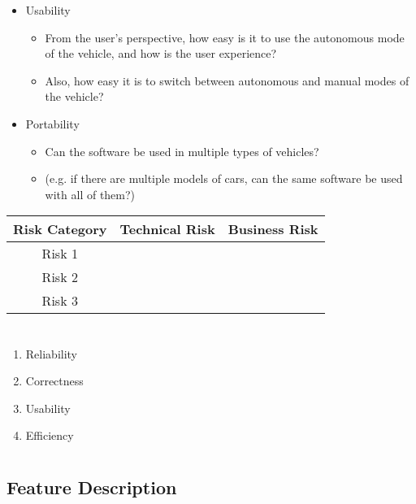 \documentclass[letterpaper]{article}
\begin{document}
\begin{itemize}
\begin{itemize}
	\end{itemize}
	\item Usability
	\begin{itemize}	
	\item From the user's perspective, how easy is it to use the autonomous mode of the vehicle, and how is the user experience?
		\item Also, how easy it is to switch between autonomous and manual modes of the vehicle?
	\end{itemize}
	\item Portability
	\begin{itemize}	
	\item Can the software be used in multiple types of vehicles? 
		\item (e.g. if there are multiple models of cars, can the same software be used with all of them?)
	\end{itemize}
\end{itemize}

\begin{table}[H]
\centering
\begin{tabular}{c|c|c|}
Risk Category & Technical Risk & Business Risk \\ \hline
Risk 1 &  &  \\ \hline
Risk 2 &  &  \\ \hline
Risk 3 &  &  \\ \hline
\end{tabular}
\end{table}

\section{}

\begin{enumerate}
	\item Reliability
	\item Correctness
	\item Usability
	\item Efficiency
\end{enumerate}

\section{}


	\subsection*{Feature Description}
\end{document}
